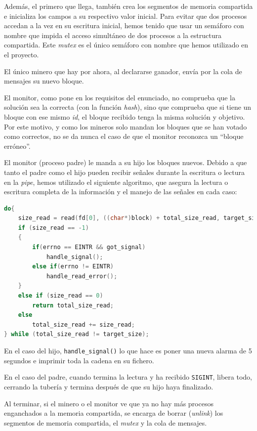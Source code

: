 \documentclass{article}
\begin{document}
    Además, el primero que llega, también crea los segmentos de memoria compartida e inicializa los campos a su respectivo valor inicial. Para evitar que dos procesos accedan a la vez en su escritura inicial, hemos tenido que usar un semáforo con nombre que impida el acceso simultáneo de dos procesos a la estructura compartida.
    Este \textit{mutex} es el único semáforo con nombre que hemos utilizado en el proyecto.

    El único minero que hay por ahora, al declararse ganador, envía por la cola de mensajes su nuevo bloque.

    El monitor, como pone en los requisitos del enunciado, no comprueba que la solución sea la correcta (con la función \emph{hash}), sino que comprueba que si tiene un bloque con ese mismo \emph{id}, el bloque recibido tenga la misma solución y objetivo. Por este motivo, y como los mineros solo mandan los bloques que se han votado como correctos, no se da nunca el caso de que el monitor reconozca un ``bloque erróneo''.

    El monitor (proceso padre) le manda a su hijo los bloques nuevos. Debido a que tanto el padre como el hijo pueden recibir señales durante la escritura o lectura en la \textit{pipe}, hemos utilizado el siguiente algoritmo, que asegura la lectura o escritura completa de la información y el manejo de las señales en cada caso:

    \begin{lstlisting}[language=C]
do{
    size_read = read(fd[0], ((char*)block) + total_size_read, target_size - total_size_read);
    if (size_read == -1)
    {
        if(errno == EINTR && got_signal)
            handle_signal();
        else if(errno != EINTR)
            handle_read_error();
    }
    else if (size_read == 0)
        return total_size_read;
    else
        total_size_read += size_read;
} while (total_size_read != target_size);\end{lstlisting}

    En el caso del hijo, \texttt{handle\_signal()} lo que hace es poner una nueva alarma de 5 segundos e imprimir toda la cadena en su fichero.

    En el caso del padre, cuando termina la lectura y ha recibido \texttt{SIGINT}, libera todo, cerrando la tubería y termina después de que su hijo haya finalizado.

    Al terminar, si el minero o el monitor ve que ya no hay más procesos enganchados a la memoria compartida, se encarga de borrar (\emph{unlink}) los segmentos de memoria compartida, el \emph{mutex} y la cola de mensajes.
\end{document}
